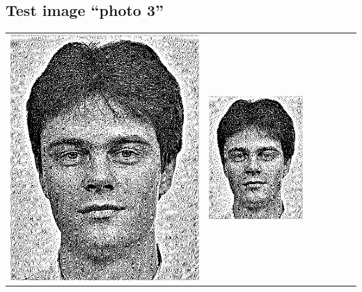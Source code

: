 \subsection{Test image ``photo 3''}
\begin{tabular}{lllllll}
	\includegraphics{Ediphoto-3-1.png} &
	\includegraphics{Ediphoto-3-2.png} &

\end{tabular}
